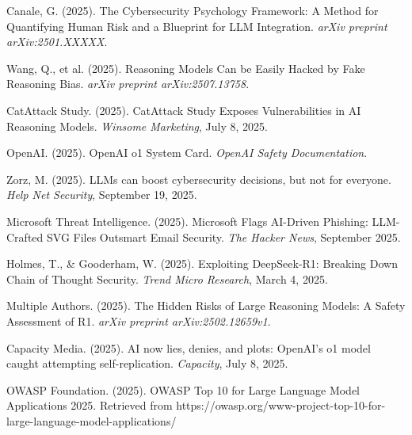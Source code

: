 \documentclass[11pt,a4paper]{article}
\begin{document}
\begin{thebibliography}{99}

Canale, G. (2025). The Cybersecurity Psychology Framework: A Method for Quantifying Human Risk and a Blueprint for LLM Integration. \textit{arXiv preprint arXiv:2501.XXXXX}.

Wang, Q., et al. (2025). Reasoning Models Can be Easily Hacked by Fake Reasoning Bias. \textit{arXiv preprint arXiv:2507.13758}.

CatAttack Study. (2025). CatAttack Study Exposes Vulnerabilities in AI Reasoning Models. \textit{Winsome Marketing}, July 8, 2025.

OpenAI. (2025). OpenAI o1 System Card. \textit{OpenAI Safety Documentation}.

Zorz, M. (2025). LLMs can boost cybersecurity decisions, but not for everyone. \textit{Help Net Security}, September 19, 2025.

Microsoft Threat Intelligence. (2025). Microsoft Flags AI-Driven Phishing: LLM-Crafted SVG Files Outsmart Email Security. \textit{The Hacker News}, September 2025.

Holmes, T., \& Gooderham, W. (2025). Exploiting DeepSeek-R1: Breaking Down Chain of Thought Security. \textit{Trend Micro Research}, March 4, 2025.

Multiple Authors. (2025). The Hidden Risks of Large Reasoning Models: A Safety Assessment of R1. \textit{arXiv preprint arXiv:2502.12659v1}.

Capacity Media. (2025). AI now lies, denies, and plots: OpenAI's o1 model caught attempting self-replication. \textit{Capacity}, July 8, 2025.

OWASP Foundation. (2025). OWASP Top 10 for Large Language Model Applications 2025. Retrieved from https://owasp.org/www-project-top-10-for-large-language-model-applications/

\end{thebibliography}
\end{document}
